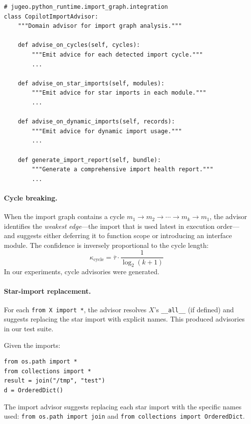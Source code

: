 \documentclass[11pt]{article}
\newcommand{\Trust}{\tau}
\newcommand{\TrustCeil}{\overline{\Trust}}
\newcommand{\Conf}{\kappa}
\begin{document}
\begin{lstlisting}[style=jugeo-python, caption={$\mathsf{CopilotImportAdvisor}$ interface.}, label={lst:import-advisor}]
# jugeo.python_runtime.import_graph.integration
class CopilotImportAdvisor:
    """Domain advisor for import graph analysis."""

    def advise_on_cycles(self, cycles):
        """Emit advice for each detected import cycle."""
        ...

    def advise_on_star_imports(self, modules):
        """Emit advice for star imports in each module."""
        ...

    def advise_on_dynamic_imports(self, records):
        """Emit advice for dynamic import usage."""
        ...

    def generate_import_report(self, bundle):
        """Generate a comprehensive import health report."""
        ...
\end{lstlisting}

\paragraph{Cycle breaking.}
When the import graph contains a cycle $m_1 \to m_2 \to \cdots \to
m_k \to m_1$, the advisor identifies the \emph{weakest edge}—the
import that is used latest in execution order—and suggests either
deferring it to function scope or introducing an interface module.
The confidence is inversely proportional to the cycle length:
\[
  \Conf_{\text{cycle}} = \TrustCeil \cdot \frac{1}{\log_2(k+1)}
\]
In our experiments, \ppXCimportCycleAdvice{} cycle advisories were
generated.

\paragraph{Star-import replacement.}
For each \texttt{from X import *}, the advisor resolves $X$'s
\texttt{\_\_all\_\_} (if defined) and suggests replacing the star
import with explicit names.  This produced \ppXCimportStarAdvice{}
advisories in our test suite.

\begin{example}\label{ex:import}
Given the imports:
\begin{lstlisting}[style=jugeo-python]
from os.path import *
from collections import *
result = join("/tmp", "test")
d = OrderedDict()
\end{lstlisting}
The import advisor suggests replacing each star import with the
specific names used: \texttt{from os.path import join} and
\texttt{from collections import OrderedDict}.
\end{example}
\end{document}
